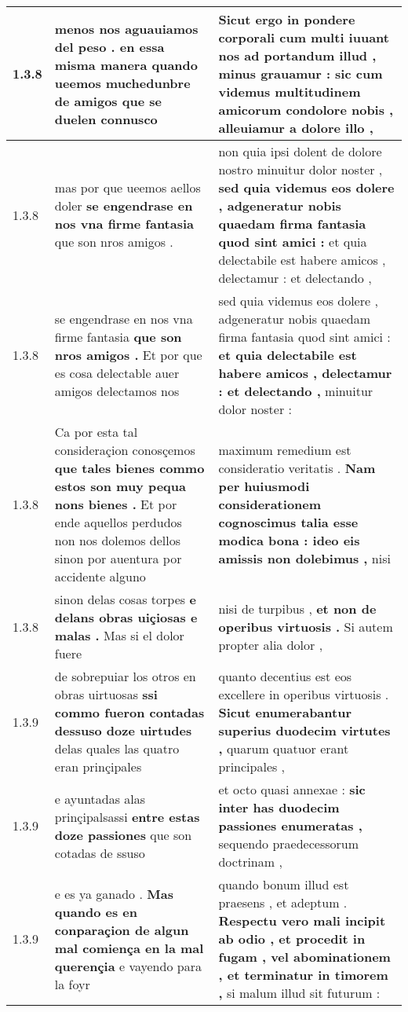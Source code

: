 \begin{tabular}{|p{1cm}|p{6.5cm}|p{6.5cm}|}
1.3.8 & menos nos aguauiamos del peso . \textbf{ en essa misma manera quando ueemos muchedunbre de amigos } que se duelen connusco & Sicut ergo in pondere corporali cum multi iuuant nos \textbf{ ad portandum illud , minus grauamur : sic cum videmus multitudinem amicorum condolore nobis , } alleuiamur a dolore illo , \\\hline
1.3.8 & mas por que ueemos aellos doler \textbf{ se engendrase en nos vna firme fantasia } que son nros amigos . & non quia ipsi dolent de dolore nostro minuitur dolor noster , \textbf{ sed quia videmus eos dolere , adgeneratur nobis quaedam firma fantasia quod sint amici : } et quia delectabile est habere amicos , delectamur : et delectando , \\\hline
1.3.8 & se engendrase en nos vna firme fantasia \textbf{ que son nros amigos . } Et por que es cosa delectable auer amigos delectamos nos & sed quia videmus eos dolere , adgeneratur nobis quaedam firma fantasia quod sint amici : \textbf{ et quia delectabile est habere amicos , delectamur : et delectando , } minuitur dolor noster : \\\hline
1.3.8 & Ca por esta tal consideraçion conosçemos \textbf{ que tales bienes commo estos son muy pequa nons bienes . } Et por ende aquellos perdudos non nos dolemos dellos sinon por auentura por accidente alguno & maximum remedium est consideratio veritatis . \textbf{ Nam per huiusmodi considerationem cognoscimus talia esse modica bona : ideo eis amissis non dolebimus , } nisi \\\hline
1.3.8 & sinon delas cosas torpes \textbf{ e delans obras uiçiosas e malas . } Mas si el dolor fuere & nisi de turpibus , \textbf{ et non de operibus virtuosis . } Si autem propter alia dolor , \\\hline
1.3.9 & de sobrepuiar los otros en obras uirtuosas \textbf{ ssi commo fueron contadas dessuso doze uirtudes } delas quales las quatro eran prinçipales & quanto decentius est eos excellere in operibus virtuosis . \textbf{ Sicut enumerabantur superius duodecim virtutes , } quarum quatuor erant principales , \\\hline
1.3.9 & e ayuntadas alas prinçipalsassi \textbf{ entre estas doze passiones } que son cotadas de ssuso & et octo quasi annexae : \textbf{ sic inter has duodecim passiones enumeratas , } sequendo praedecessorum doctrinam , \\\hline
1.3.9 & e es ya ganado . \textbf{ Mas quando es en conparaçion de algun mal comiença en la mal querençia } e vayendo para la foyr & quando bonum illud est praesens , et adeptum . \textbf{ Respectu vero mali incipit ab odio , et procedit in fugam , vel abominationem , et terminatur in timorem , } si malum illud sit futurum : \\\hline

\end{tabular}

